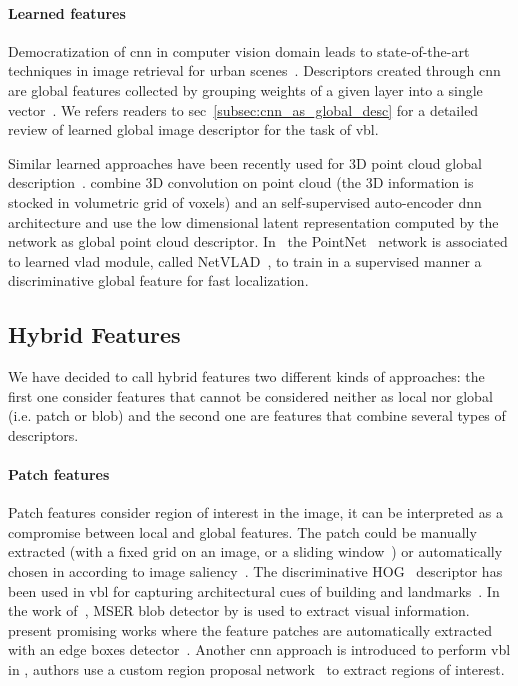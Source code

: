 		\paragraph{Learned features}
			\label{para:global_cnn}
			Democratization of \ac{cnn} in computer vision domain leads to state-of-the-art techniques in image retrieval for urban scenes~\citep{Arandjelovic2017,Gordo2016,Kim2017a,Radenovic2016}. Descriptors created through \ac{cnn} are global features collected by grouping weights of a given layer into a single vector~\citep{Babenko2014}. We refers readers to \acl{sec}~\ref{subsec:cnn_as_global_desc} for a detailed review of learned global image descriptor for the task of \ac{vbl}. 
			
			Similar learned approaches have been recently used for 3D point cloud global description~\citep{}. \citet{Scj} combine 3D convolution on point cloud (the 3D information is stocked in volumetric grid of voxels) and an self-supervised auto-encoder \ac{dnn} architecture and use the low dimensional latent representation computed by the network as global point cloud descriptor. In~\citep{Uy2018} the PointNet~\citep{Qi2016a} network is associated to learned \ac{vlad} module, called NetVLAD~\citep{Arandjelovic2017}, to train in a supervised manner a discriminative global feature for fast localization.

	\subsection{Hybrid Features}
	\label{subsec:hybrid_feature}
		We have decided to call hybrid features two different kinds of approaches: the first one consider features that cannot be considered neither as local nor global (i.e. patch or blob) and the second one are features that combine several types of descriptors.
		\paragraph{Patch features}
			Patch features consider region of interest in the image, it can be interpreted as a compromise between local and global features. The patch could be manually extracted (with a fixed grid on an image, or a sliding window~\citep{Dalal2005}) or automatically chosen in according to image saliency~\citep{Matas2004}. The discriminative HOG~\citep{Dalal2005} descriptor has been used in \ac{vbl} for capturing architectural cues of building and landmarks~\citep{Shrivastava2011, Aubry2014, McManus2014,Morago2016}. In the work of~\citep{Nister2006,Kim2015}, MSER blob detector by \citet{Matas2004} is used to extract visual information. \citet{Sunderhauf2015a} present promising works where the feature patches are automatically extracted with an edge boxes detector~\citep{Zitnick2014}. Another \ac{cnn} approach is introduced to perform \ac{vbl} in \citep{Gordo2016}, authors use a custom region proposal network~\citep{Ren2015} to extract regions of interest.
			
